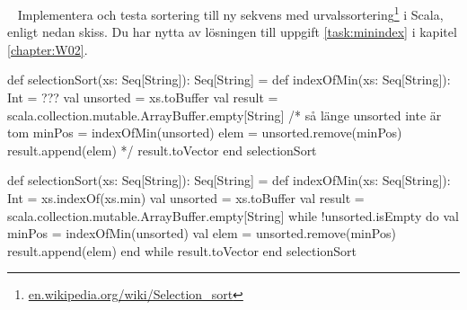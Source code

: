 




\QUESTEND



\clearpage




\QUESTBEGIN

\Task  \what~ Implementera och testa sortering till ny sekvens med urvalssortering\footnote{\href{https://en.wikipedia.org/wiki/Selection_sort}{en.wikipedia.org/wiki/Selection\_sort}} i Scala, enligt nedan skiss.  Du har nytta av lösningen till uppgift \ref{task:minindex} i kapitel \ref{chapter:W02}.
\begin{Code}
def selectionSort(xs: Seq[String]): Seq[String] = 
  def indexOfMin(xs: Seq[String]): Int = ???
  val unsorted = xs.toBuffer
  val result = scala.collection.mutable.ArrayBuffer.empty[String]
  /*
  så länge unsorted inte är tom 
    minPos = indexOfMin(unsorted)
    elem   = unsorted.remove(minPos)
    result.append(elem)
  */
  result.toVector
end selectionSort
\end{Code}



\SOLUTION


\TaskSolved \what


\begin{Code}
def selectionSort(xs: Seq[String]): Seq[String] = 
  def indexOfMin(xs: Seq[String]): Int = xs.indexOf(xs.min)
  val unsorted = xs.toBuffer
  val result = scala.collection.mutable.ArrayBuffer.empty[String]
  while !unsorted.isEmpty do
    val minPos = indexOfMin(unsorted)
    val elem = unsorted.remove(minPos)
    result.append(elem)
  end while
  result.toVector
end selectionSort
\end{Code}


\QUESTEND














